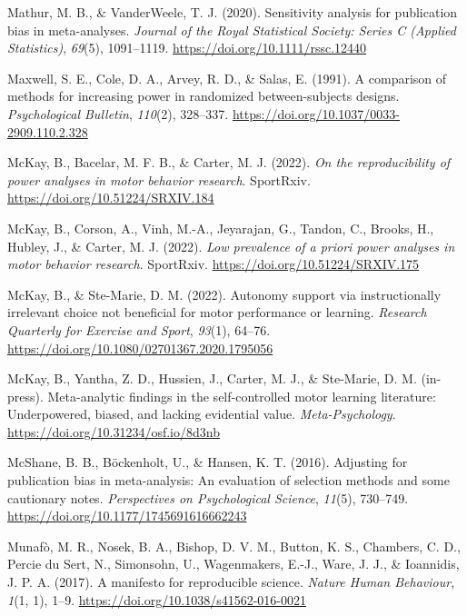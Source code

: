 \documentclass[
  doc, donotrepeattitle,floatsintext]{apa7}
\newlength{\cslhangindent}
\newlength{\cslentryspacingunit} %
\newenvironment{CSLReferences}[2] %
 {%
  \setlength{\parindent}{0pt}
  \ifodd #1
  \let\oldpar\par
  \def\par{\hangindent=\cslhangindent\oldpar}
  \fi
  \setlength{\parskip}{#2\cslentryspacingunit}
 }%
 {}
\begin{document}
\begin{CSLReferences}{1}{0}
\leavevmode{}%
Mathur, M. B., \& VanderWeele, T. J. (2020). Sensitivity analysis for publication bias in meta-analyses. \emph{Journal of the Royal Statistical Society: Series C (Applied Statistics)}, \emph{69}(5), 1091--1119. \url{https://doi.org/10.1111/rssc.12440}

\leavevmode{}%
Maxwell, S. E., Cole, D. A., Arvey, R. D., \& Salas, E. (1991). A comparison of methods for increasing power in randomized between-subjects designs. \emph{Psychological Bulletin}, \emph{110}(2), 328--337. \url{https://doi.org/10.1037/0033-2909.110.2.328}

\leavevmode{}%
McKay, B., Bacelar, M. F. B., \& Carter, M. J. (2022). \emph{On the reproducibility of power analyses in motor behavior research}. {SportRxiv}. \url{https://doi.org/10.51224/SRXIV.184}

\leavevmode{}%
McKay, B., Corson, A., Vinh, M.-A., Jeyarajan, G., Tandon, C., Brooks, H., Hubley, J., \& Carter, M. J. (2022). \emph{Low prevalence of a priori power analyses in motor behavior research}. {SportRxiv}. \url{https://doi.org/10.51224/SRXIV.175}

\leavevmode{}%
McKay, B., \& Ste-Marie, D. M. (2022). Autonomy support via instructionally irrelevant choice not beneficial for motor performance or learning. \emph{Research Quarterly for Exercise and Sport}, \emph{93}(1), 64--76. \url{https://doi.org/10.1080/02701367.2020.1795056}

\leavevmode{}%
McKay, B., Yantha, Z. D., Hussien, J., Carter, M. J., \& Ste-Marie, D. M. (in-press). Meta-analytic findings in the self-controlled motor learning literature: Underpowered, biased, and lacking evidential value. \emph{Meta-Psychology}. \url{https://doi.org/10.31234/osf.io/8d3nb}

\leavevmode{}%
McShane, B. B., Böckenholt, U., \& Hansen, K. T. (2016). Adjusting for publication bias in meta-analysis: An evaluation of selection methods and some cautionary notes. \emph{Perspectives on Psychological Science}, \emph{11}(5), 730--749. \url{https://doi.org/10.1177/1745691616662243}

\leavevmode{}%
Munafò, M. R., Nosek, B. A., Bishop, D. V. M., Button, K. S., Chambers, C. D., Percie du Sert, N., Simonsohn, U., Wagenmakers, E.-J., Ware, J. J., \& Ioannidis, J. P. A. (2017). A manifesto for reproducible science. \emph{Nature Human Behaviour}, \emph{1}(1, 1), 1--9. \url{https://doi.org/10.1038/s41562-016-0021}


\end{CSLReferences}
\end{document}

